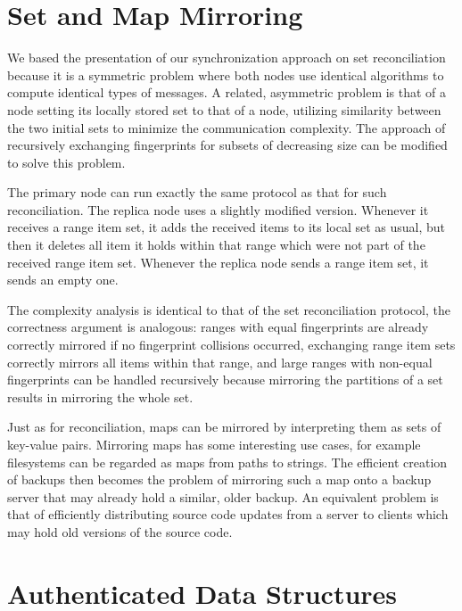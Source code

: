 \section{Set and Map Mirroring}
\label{set-mirror}

We based the presentation of our synchronization approach on set reconciliation because it is a symmetric problem where both nodes use identical algorithms to compute identical types of messages. A related, asymmetric problem is that of a  node setting its locally stored set to that of a  node, utilizing similarity between the two initial sets to minimize the communication complexity. The approach of recursively exchanging fingerprints for subsets of decreasing size can be modified to solve this  problem.

The primary node can run exactly the same protocol as that for such reconciliation. The replica node uses a slightly modified version. Whenever it receives a range item set, it adds the received items to its local set as usual, but then it deletes all item it holds within that range which were not part of the received range item set. Whenever the replica node sends a range item set, it sends an empty one.

The complexity analysis is identical to that of the set reconciliation protocol, the correctness argument is analogous: ranges with equal fingerprints are already correctly mirrored if no fingerprint collisions occurred, exchanging range item sets correctly mirrors all items within that range, and large ranges with non-equal fingerprints can be handled recursively because mirroring the partitions of a set results in mirroring the whole set.

Just as for reconciliation, maps can be mirrored by interpreting them as sets of key-value pairs. Mirroring maps has some interesting use cases, for example filesystems can be regarded as maps from paths to strings. The efficient creation of backups then becomes the problem of mirroring such a map onto a backup server that may already hold a similar, older backup. An equivalent problem is that of efficiently distributing source code updates from a server to clients which may hold old versions of the source code.

\section{Authenticated Data Structures}
\label{authenticated}

